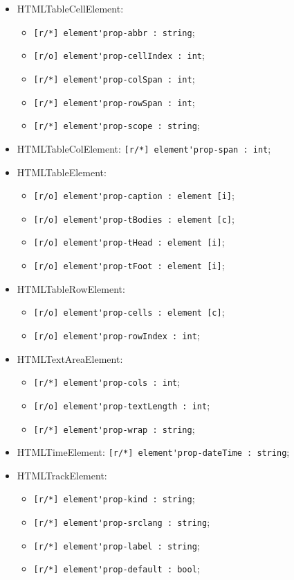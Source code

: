 \documentclass[a4paper, 14pt]{extarticle}
\newenvironment{icItems}
	{ \begin{itemize} [noitemsep,nolistsep] }
	{ \end{itemize} }
\begin{document}
\begin{icItems}
	\item HTMLTableCellElement:
	\begin{icItems}
		\item \lstinline|[r/*] element'prop-abbr : string|;
		\item \lstinline|[r/o] element'prop-cellIndex : int|;
		\item \lstinline|[r/*] element'prop-colSpan : int|;
		\item \lstinline|[r/*] element'prop-rowSpan : int|;
		\item \lstinline|[r/*] element'prop-scope : string|;
	\end{icItems}
	
	\item HTMLTableColElement: \lstinline|[r/*] element'prop-span : int|;
	
	\item HTMLTableElement:
	\begin{icItems}
		\item \lstinline|[r/o] element'prop-caption : element [i]|;
		\item \lstinline|[r/o] element'prop-tBodies : element [c]|;
		\item \lstinline|[r/o] element'prop-tHead : element [i]|;
		\item \lstinline|[r/o] element'prop-tFoot : element [i]|;
	\end{icItems}
	
	\item HTMLTableRowElement:
	\begin{icItems}
		\item \lstinline|[r/o] element'prop-cells : element [c]|;
		\item \lstinline|[r/o] element'prop-rowIndex : int|;
	\end{icItems}
	
	\item HTMLTextAreaElement:
	\begin{icItems}
		\item \lstinline|[r/*] element'prop-cols : int|;
		\item \lstinline|[r/o] element'prop-textLength : int|;
		\item \lstinline|[r/*] element'prop-wrap : string|;
	\end{icItems}
	
	\item HTMLTimeElement: \lstinline|[r/*] element'prop-dateTime : string|;
	
	\item HTMLTrackElement:
	\begin{icItems}
		\item \lstinline|[r/*] element'prop-kind : string|;
		\item \lstinline|[r/*] element'prop-srclang : string|;
		\item \lstinline|[r/*] element'prop-label : string|;
		\item \lstinline|[r/*] element'prop-default : bool|;
	\end{icItems}
	

\end{icItems}
\end{document}
